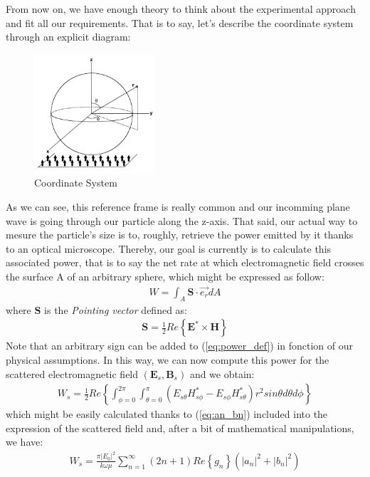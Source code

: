 \documentclass{article}
\numberwithin{equation}{section}
\begin{document}
From now on, we have enough theory to think about the experimental approach and fit all our requirements. That is to say, let's describe the coordinate system through an explicit diagram:
\begin{figure}[h]
    \centering
    \includegraphics[width=0.4\textwidth, height=0.4\textwidth]{system.png}
    \caption{Coordinate System}
    \label{fig:system}
\end{figure}
As we can see, this reference frame is really common and our incomming plane wave is going through our particle along the z-axis. That said, our actual way to mesure the particle's size is to, roughly, retrieve the power emitted by it thanks to an optical microscope. Thereby, our goal is currently is to calculate this associated power, that is to say the net rate at which electromagnetic field crosses the surface A of an arbitrary sphere, which might be expressed as follow:
\begin{align}\label{eq:power_def}
W=\int_{A}^{}\textbf{S}\cdot \overrightarrow{e_{r}}dA
\end{align}
where $\textbf{S}$ is the \textit{Pointing vector} defined as:
\begin{align}
\textbf{S} = \frac{1}{2}Re\left\{\textbf{E}^{*} \times \textbf{H}\right\}
\end{align}
Note that an arbitrary sign can be added to (\ref{eq:power_def}) in fonction of our physical assumptions. In this way, we can now compute this power for the scattered electromagnetic field $(\textbf{E}_{s}, \textbf{B}_{s})$ and we obtain:
\begin{align}\label{eq:w_s}
W_{s}=\frac{1}{2}Re\left\{ \int_{\phi=0}^{2\pi}\int_{\theta=0}^{\pi} (E_{s\theta}H^{*}_{s\phi} - E_{s\phi}H^{*}_{s\theta})r^{2}sin\theta d\theta d\phi\right\}
\end{align}
which might be easily calculated thanks to (\ref{eq:an_bn}) included into the expression of the scattered field and, after a bit of mathematical manipulations, we have:
\begin{align}
W_{s}=\frac{\pi\left| E_{0} \right|^{2}}{k\omega\mu}\sum_{n=1}^{\infty }(2n+1)Re\left\{ g_{n} \right\}(\left| a_{n} \right|^{2}+\left| b_{n} \right|^{2})
\end{align}
\end{document}
